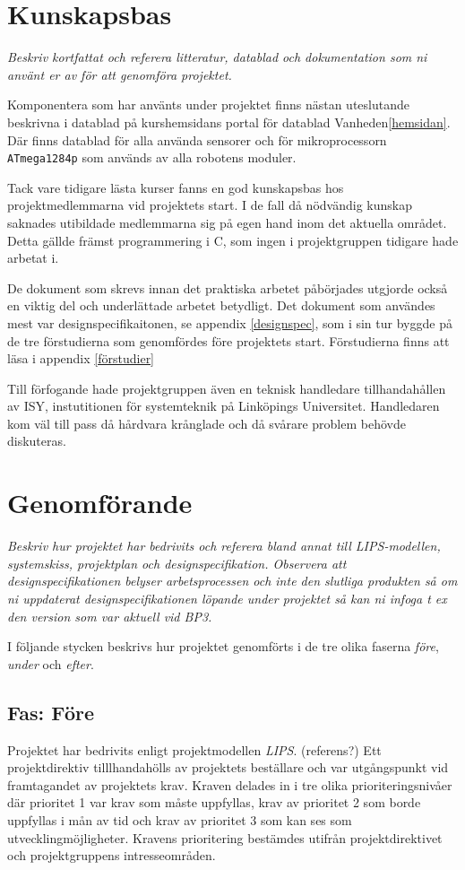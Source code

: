 \documentclass[11pt]{article}
\begin{document}
\begin{flushleft}
\section{Kunskapsbas}
\textit{Beskriv kortfattat och referera litteratur, datablad och dokumentation som ni använt er av för att genomföra projektet.}

Komponentera som har använts under projektet finns nästan uteslutande beskrivna i datablad på kurshemsidans portal för datablad Vanheden\ref{hemsidan}. Där finns datablad för alla använda sensorer och för mikroprocessorn \verb+ATmega1284p+ som används av alla robotens moduler.

Tack vare tidigare lästa kurser fanns en god kunskapsbas hos projektmedlemmarna vid projektets start. I de fall då nödvändig kunskap saknades utibildade medlemmarna sig på egen hand inom det aktuella området. Detta gällde främst programmering i C, som ingen i projektgruppen tidigare hade arbetat i. 

De dokument som skrevs innan det praktiska arbetet påbörjades utgjorde också en viktig del och underlättade arbetet betydligt. Det dokument som användes mest var designspecifikaitonen, se appendix \ref{designspec}, som i sin tur byggde på de tre förstudierna som genomfördes före projektets start. Förstudierna finns att läsa i appendix \ref{förstudier}

Till förfogande hade projektgruppen även en teknisk handledare tillhandahållen av ISY, instutitionen för systemteknik på Linköpings Universitet. Handledaren kom väl till pass då hårdvara krånglade och då svårare problem behövde diskuteras.

\pagebreak

\section{Genomförande}
\textit{Beskriv hur projektet har bedrivits och referera bland annat till LIPS-modellen, systemskiss, projektplan och designspecifikation. Observera att designspecifikationen belyser arbetsprocessen och inte den slutliga produkten så om ni uppdaterat designspecifikationen löpande under projektet så kan ni infoga t ex den version som var aktuell vid BP3.}

I följande stycken beskrivs hur projektet genomförts i de tre olika faserna \textit{före}, \textit{under} och \textit{efter}.

\subsection{Fas: Före}
Projektet har bedrivits enligt projektmodellen \textit{LIPS}. (referens?) Ett projektdirektiv tilllhandahölls av projektets beställare och var utgångspunkt vid framtagandet av projektets krav. Kraven delades in i tre olika prioriteringsnivåer där prioritet 1 var krav som måste uppfyllas, krav av prioritet 2 som borde uppfyllas i mån av tid och krav av prioritet 3 som kan ses som utvecklingmöjligheter. Kravens prioritering bestämdes utifrån projektdirektivet och projektgruppens intresseområden. 


\end{flushleft}
\end{document}
